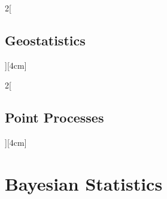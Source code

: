 \documentclass[8pt]{extarticle}
\begin{document}
\begin{multicols}{2}[\subsection{Geostatistics}][4cm] 

\end{multicols}

\begin{multicols}{2}[\subsection{Point Processes}][4cm] 

\end{multicols}



\section{Bayesian Statistics}
\end{document}
